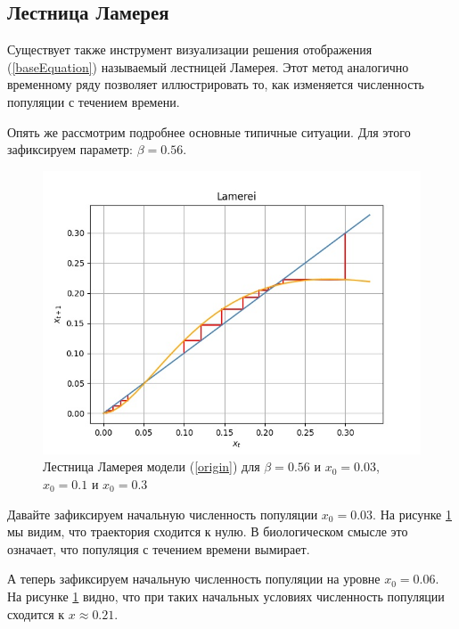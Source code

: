 \subsection{Лестница Ламерея}

    Существует также инструмент визуализации решения отображения (\ref{baseEquation}) называемый лестницей Ламерея. Этот метод аналогично временному ряду позволяет иллюстрировать то, как изменяется численность популяции с течением времени.
    
    Опять же рассмотрим подробнее основные типичные ситуации. Для этого зафиксируем параметр: \(\beta = 0.56\). 

    \begin{figure}
        \centering
        \includegraphics[width=\textwidth]{deterministic/images/lamerei_b_0_56.jpg}

        \captionsetup{justification=centering}
        \caption{Лестница Ламерея модели (\ref{origin}) для \(\beta = 0.56\) и \(x_0 = 0.03\), \(x_0 = 0.1\) и \(x_0 = 0.3\)}
        \label{lamerei_b_0_56}
    \end{figure}

    Давайте зафиксируем начальную численность популяции \(x_0 = 0.03\). На рисунке \ref{lamerei_b_0_56} мы видим, что траектория сходится к нулю. В биологическом смысле это означает, что популяция с течением времени вымирает.

    А теперь зафиксируем начальную численность популяции на уровне \(x_0 = 0.06\). На рисунке \ref{lamerei_b_0_56} видно, что при таких начальных условиях численность популяции сходится к \(x \approx 0.21\).
    
